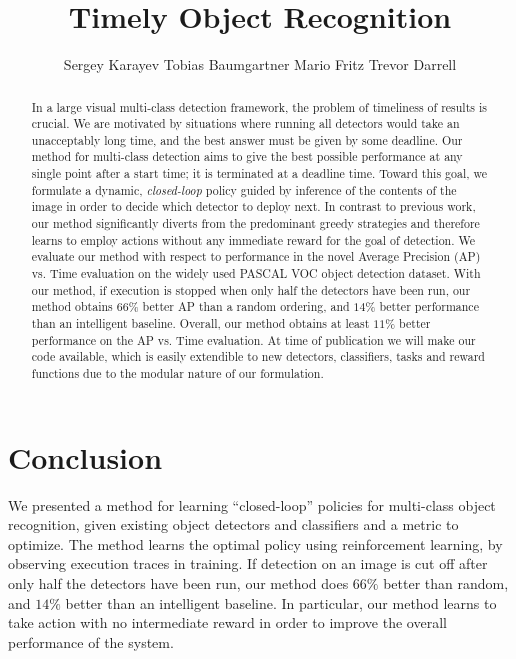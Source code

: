 \documentclass{article} %
\title{Timely Object Recognition}
\author{
Sergey Karayev \And
Tobias Baumgartner \And
Mario Fritz \And
Trevor Darrell
}
\begin{document}
\maketitle

\begin{abstract}
In a large visual multi-class detection framework, the problem of timeliness of results is crucial.
We are motivated by situations where running all detectors would take an unacceptably long time, and the best answer must be given by some deadline.
Our method for multi-class detection aims to give the best possible performance at any single point after a start time; it is terminated at a deadline time.
Toward this goal, we formulate a dynamic, \emph{closed-loop} policy guided by inference of the contents of the image in order to decide which detector to deploy next.
In contrast to previous work, our method significantly diverts from the predominant greedy strategies and therefore learns to employ actions without any immediate reward for the goal of detection.
We evaluate our method with respect to performance in the novel Average Precision (AP) vs. Time evaluation on the widely used PASCAL VOC object detection dataset.
With our method, if execution is stopped when only half the detectors have been run, our method obtains $66\%$ better AP than a random ordering, and $14\%$ better performance than an intelligent baseline.
Overall, our method obtains at least $11\%$ better performance on the AP vs. Time evaluation. At time of publication we will make our code available, which is easily extendible to new detectors, classifiers, tasks and reward functions due to the modular nature of our formulation.
\end{abstract}





\section{Conclusion}
We presented a method for learning ``closed-loop'' policies for multi-class object recognition, given existing object detectors and classifiers and a metric to optimize.
The method learns the optimal policy using reinforcement learning, by observing execution traces in training.
If detection on an image is cut off after only half the detectors have been run, our method does $66\%$ better than random, and $14\%$ better than an intelligent baseline. In particular, our method learns to take action with no intermediate reward in order to improve the overall performance of the system.
\end{document}
